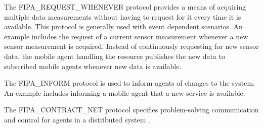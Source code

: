     The FIPA\_REQUEST\_WHENEVER protocol provides a means of acquiring multiple 
      data measurements without having to request for it every time it is 
      available.
    This protocol is generally used with event dependent scenarios.
    An example includes the request of a current sensor measurement whenever a 
      new sensor measurement is acquired.
    Instead of continuously requesting for new sensor data, the mobile agent 
      handling the resource publishes the new data to subscribed mobile agents 
      whenever new data is available.

    The FIPA\_INFORM protocol is used to inform agents of changes to the system.
    An example includes informing a mobile agent that a new service is available.
 
    The FIPA\_CONTRACT\_NET protocol specifies problem-solving communication and 
      control for agents in a distributed system \cite{Smith1980}.

